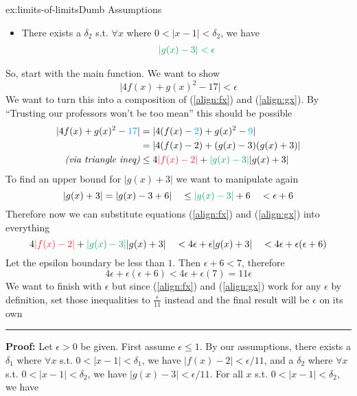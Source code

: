 \documentclass[landscape, 8pt]{extarticle}
\begin{document}
\begin{multicols}{3}
\begin{xmp}{ex:limits-of-limits}{Dumb Assumptions}
\begin{itemize}
    \item There exists a $\delta_{2}$ s.t. $\forall x$ where $0<\lvert x-1\rvert < \delta_{2}$, we have 
    \begin{align}{\color{colour2}
        \lvert g(x) - 3\rvert < \epsilon \label{align:gx}
    }\end{align}
\end{itemize}
So, start with the main function. We want to show
\[\lvert 4f(x) + g(x)^{2} - 17 \rvert < \epsilon\]
We want to turn this into a composition of (\ref{align:fx}) and (\ref{align:gx}). By ``Trusting our professors won't be too mean'' this should be possible
\[\begin{aligned}
    \lvert 4f(x)+g(x)^{2} - {\color{colour3}17} \rvert &= \lvert 4(f(x)-{\color{colour3}2}) + g(x)^{2}-{\color{colour3}9}\rvert \\
    &= \lvert 4(f(x)-2) + (g(x)-3)(g(x)+3)\rvert \\
    \text{\textit{(via triangle ineq)}} &\le 4{\color{colour1}\lvert f(x)-2\rvert} + {\color{colour2}\lvert g(x)-3\rvert} \lvert g(x)+3\rvert \\
\end{aligned}\]
To find an upper bound for $\lvert g(x) + 3\rvert$ we want to manipulate again
\[\lvert g(x) + 3\rvert = \lvert g(x) - 3 + 6\rvert \quad\le {\color{colour2}\lvert g(x) - 3\rvert} + 6 \quad< \epsilon + 6\]
Therefore now we can substitute equations (\ref{align:fx}) and (\ref{align:gx}) into everything
\[4{\color{colour1}\lvert f(x)-2\rvert} + {\color{colour2}\lvert g(x)-3\rvert} \lvert g(x)+3\rvert \quad< 4\epsilon + \epsilon \lvert g(x) + 3\rvert \quad< 4\epsilon + \epsilon(\epsilon+6)\]
Let the epsilon boundary be less than $1$. Then $\epsilon + 6 < 7$, therefore
\[4\epsilon + \epsilon(\epsilon + 6) < 4\epsilon + \epsilon(7) = 11\epsilon\]
We want to finish with $\epsilon$ but since (\ref{align:fx}) and (\ref{align:gx}) work for any $\epsilon$ by definition, set those inequalities to $\frac{\epsilon}{11}$ instead and the final result will be $\epsilon$ on its own
\vspace{3pt}
\hrule
\vspace{3pt}
\noindent\textbf{Proof:} Let $\epsilon > 0$ be given. First assume $\epsilon\le 1$. By our assumptions, there exists a $\delta_{1}$ where $\forall x$ s.t. $0<\lvert x-1\rvert < \delta_{1}$, we have $\lvert f(x) - 2\rvert < {\epsilon}/{11}$, and a $\delta_{2}$ where $\forall x$ s.t. $0<\lvert x-1\rvert < \delta_{2}$, we have $\lvert g(x) - 3\rvert < {\epsilon}/{11}$. For all $x$ s.t. $0<\lvert x-1\rvert < \delta_{2}$, we have

\end{xmp}
\end{multicols}
\end{document}
